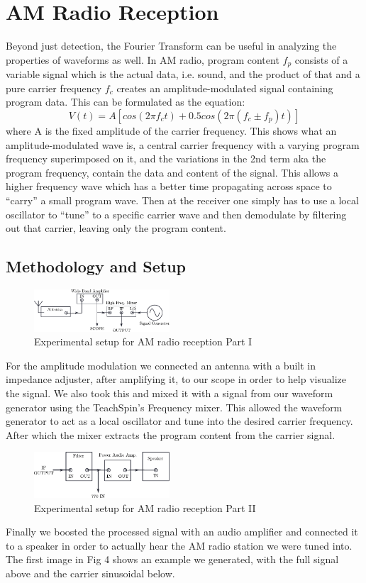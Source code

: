 \documentclass[prl,twocolumn,superscriptaddress,floatfix]{revtex4}
\begin{document}
\section{AM Radio Reception}

Beyond just detection, the Fourier Transform can be useful in analyzing the properties of waveforms as well.
In AM radio, program content $f_{p}$ consists of a variable signal which is the actual data, i.e. sound, and the product of that and a pure carrier frequency $f_{c}$ creates an amplitude-modulated signal containing program data.
This can be formulated as the equation:
\begin{equation}
    V(t) = A[cos(2\pi f_{c}t)+0.5cos(2\pi(f_{c} \pm f_{p})t)]
\end{equation}
where A is the fixed amplitude of the carrier frequency.
This shows what an amplitude-modulated wave is, a central carrier frequency with a varying program frequency superimposed on it, and the variations in the 2nd term aka the program frequency, contain the data and content of the signal.
This allows a higher frequency wave which has a better time propagating across space to ``carry'' a small program wave.
Then at the receiver one simply has to use a local oscillator to ``tune'' to a specific carrier wave and then demodulate by filtering out that carrier, leaving only the program content.
\subsection{Methodology and Setup}
\begin{figure}[H]
    \includegraphics[width=0.45\textwidth]{exp2_1.pdf}
    \caption{Experimental setup for AM radio reception Part I}
    \label{fig:AM1}
\end{figure}
For the amplitude modulation we connected an antenna with a built in impedance adjuster, after amplifying it, to our scope in order to help visualize the signal. We also took this and mixed it with a signal from our waveform generator using the TeachSpin's Frequency mixer. This allowed the waveform generator to act as a local oscillator and tune into the desired carrier frequency. After which the mixer extracts the program content from the carrier signal. 
\begin{figure}[H]
    \includegraphics[width=0.45\textwidth]{exp2_2.pdf}
    \caption{Experimental setup for AM radio reception Part II}
    \label{fig:AM2}
\end{figure}
Finally we boosted the processed signal with an audio amplifier and connected it to a speaker in order to actually hear the AM radio station we were tuned into.
The first image in Fig 4 shows an example we generated, with the full signal above and the carrier sinusoidal below.
\end{document}
